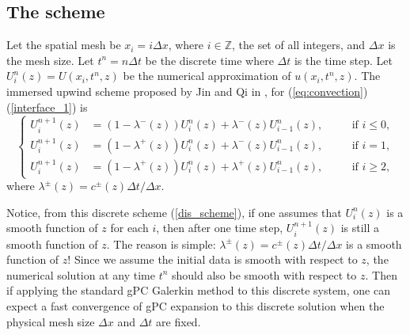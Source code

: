 \documentclass[12pt]{article}
\theoremstyle{plain}
\theoremstyle{remark}
\theoremstyle{remark}
\theoremstyle{remark}
\numberwithin{equation}{section}
\newcommand{\Z}{{\mathbb{Z}}}
\newcommand{\Dx}{\Delta x}
\newcommand{\Dt}{\Delta t}
\newcommand{\tn}{t^n}
\newcommand{\x}{x_i}
\newcommand{\Uniz}{U^n_i(z)}
\newcommand{\Unpiz}{U^{n+1}_i(z)}
\newcommand{\Unimz}{U^n_{i-1}(z)}
\newcommand{\lpmz}{\lambda^{\pm}(z)}
\begin{document}
\subsection{The scheme}

Let the spatial mesh be $\x = i\Dx$, where $i\in\Z$, the set of all integers, and $\Dx$ is the mesh size. Let $\tn = n\Dt$ be the discrete time where $\Dt$ is the time step. Let $\Uniz = U(\x,\tn,z)$ be the numerical approximation of $u(\x, \tn, z)$. The immersed upwind scheme proposed by Jin and Qi in \cite{Qi:2013byba}, for (\ref{eq:convection}) (\ref{interface_1}) is
\begin{equation}\label{dis_scheme}
  \left\{
  \begin{aligned}
    \Unpiz &= (1 - \lambda^-(z))\Uniz+\lambda^-(z)\Unimz, &\quad&\text{if $i\leq 0$}, \\
    \Unpiz &= (1 - \lambda^+(z))\Uniz+\lambda^-(z)\Unimz, &&\text{if $i = 1$}, \\
    \Unpiz &= (1 - \lambda^+(z))\Uniz+\lambda^+(z)\Unimz, &&\text{if $i\geq 2$}, 
  \end{aligned}
  \right.
\end{equation}
where $\lambda^{\pm}(z) = c^{\pm}(z) \Dt / \Dx$.

Notice, from this discrete scheme (\ref{dis_scheme}), if one assumes that 
$\Uniz$ is a smooth function of $z$ for each $i$, then after one time step,  $\Unpiz$ is still a smooth function of $z$. The reason is simple: $\lpmz = c^{\pm}(z) \Dt / \Dx$ is a smooth function of $z$! Since we assume the initial data is smooth with respect to $z$, the numerical solution at any time $\tn$ should also be smooth with respect to $z$. Then if applying the standard gPC Galerkin method to this discrete system, one can expect a fast convergence of gPC expansion to this discrete solution when the physical mesh size $\Dx$ and $\Dt$ are fixed. 
\end{document}
